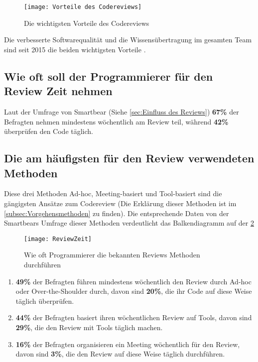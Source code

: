 \begin{figure}[H]
	\centering
	\texttt{[image: Vorteile des Codereviews]}
	\caption[Vorteile des Codereviews]{Die wichtigsten Vorteile des Codereviews\\ \cite{smartbear}}
	\label{fig:Vorteile des Codereviews}
\end{figure}

Die verbesserte Softwarequalität und die Wissensübertragung im gesamten Team sind seit 2015 die beiden wichtigsten Vorteile \cite{smartbear}.

\subsection{Wie oft soll der Programmierer für den Review Zeit nehmen}
\label{subsec:reviewerZeit}

Laut der Umfrage von Smartbear (Siehe \cref{sec:Einfluss des Reviews}) \textbf{67\%} der Befragten nehmen mindestens wöchentlich am Review teil, während \textbf{42\%} überprüfen den Code täglich.

\subsection{Die am häufigsten für den Review verwendeten Methoden}
\label{subsec:Die am häufigsten verwendete Methoden}

Diese drei Methoden Ad-hoc, Meeting-basiert und Tool-basiert sind die gängigsten Ansätze zum Codereview (Die Erklärung dieser Methoden ist im \cref{subsec:Vorgehensmethoden} zu finden).
Die entsprechende Daten von der Smartbears Umfrage \cite{smartbear} dieser Methoden verdeutlicht das Balkendiagramm auf der \cref{fig:ReviewZeit} 

\begin{figure}[H]
	\centering
	\texttt{[image: ReviewZeit]}
	\caption[Wie oft Programmierer die bekannten Reviews Methoden durchführen]{Wie oft Programmierer die bekannten Reviews Methoden durchführen\\\cite{smartbear}}
	\label{fig:ReviewZeit}
\end{figure}

\begin{enumerate}
	\item \textbf{49\%} der Befragten führen mindestens wöchentlich den Review durch Ad-hoc oder Over-the-Shoulder durch, davon sind \textbf{20\%}, die ihr Code auf diese Weise 					täglich überprüfen.
	\item \textbf{44\%} der Befragten basiert ihren wöchentlichen Review auf Tools, davon sind \textbf{29\%}, die den Review mit Tools täglich machen.
	\item \textbf{16\%} der Befragten organisieren ein Meeting wöchentlich für den Review, davon sind \textbf{3\%}, die den Review auf diese Weise täglich durchführen.
\end{enumerate}


